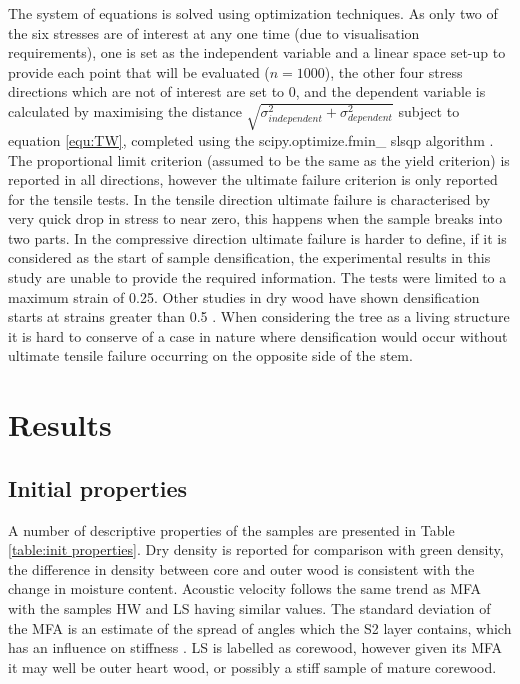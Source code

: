 \documentclass[10pt]{article}
\begin{document}
The system of equations is solved using optimization techniques. As only two of the six stresses are of interest at any one time (due to visualisation requirements), one is set as the independent variable and a linear space set-up to provide each point that will be evaluated (\(n=1000\)), the other four stress directions which are not of interest are set to 0, and the dependent variable is calculated by maximising the distance \(\sqrt{\sigma_{independent}^2+\sigma_{dependent}^2}\) subject to equation \ref{equ:TW}, completed using the scipy.optimize.fmin\_ slsqp algorithm \citep{jones_scipy:_2001}.
The proportional limit criterion (assumed to be the same as the yield criterion) is reported in all directions, however the ultimate failure criterion is only reported for the tensile tests. In the tensile direction ultimate failure is characterised by very quick drop in stress to near zero, this happens when the sample breaks into two parts. In the compressive direction ultimate failure is harder to define, if it is considered as the start of sample densification, the experimental results in this study are unable to provide the required information. The tests were limited to a maximum strain of 0.25. Other studies in dry wood have shown densification starts at strains greater than 0.5 \citep{gibson_l._ashby_cellular_1997}. When considering the tree as a living structure it is hard to conserve of a case in nature where densification would occur without ultimate tensile failure occurring on the opposite side of the stem.


\section{Results}
\subsection{Initial properties}
A number of descriptive properties of the samples are presented in Table \ref{table:init properties}. Dry density is reported for comparison with green density, the difference in density between core and outer wood is consistent with the change in moisture content. Acoustic velocity follows the same trend as MFA with the samples HW and LS having similar values. The standard deviation of the MFA is an estimate of the spread of angles which the S2 layer contains, which has an influence on stiffness \citep{cave_interpretation_1998}. LS is labelled as corewood, however given its MFA it may well be outer heart wood, or possibly a stiff sample of mature corewood.
\end{document}
